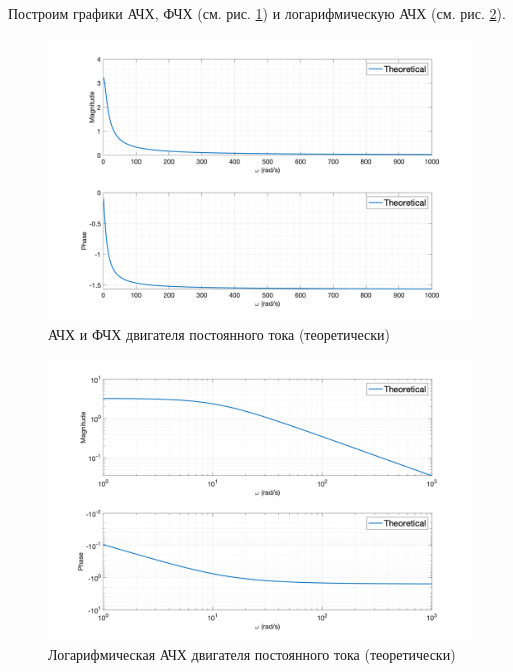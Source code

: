 Построим графики АЧХ, ФЧХ (см. рис. \ref{fig:task1_freq_resp_eq_lin}) и логарифмическую АЧХ (см. рис. \ref{fig:task1_freq_resp_eq_loglog}).
\begin{figure}[ht!]
    \centering
    \includegraphics[width=\textwidth]{media/plots/task1_freq_resp_eq_lin.png}
    \caption{АЧХ и ФЧХ двигателя постоянного тока (теоретически)}
    \label{fig:task1_freq_resp_eq_lin}
\end{figure}
\begin{figure}[ht!]
    \centering
    \includegraphics[width=\textwidth]{media/plots/task1_freq_resp_eq_loglog.png}
    \caption{Логарифмическая АЧХ двигателя постоянного тока (теоретически)}
    \label{fig:task1_freq_resp_eq_loglog}
\end{figure}

